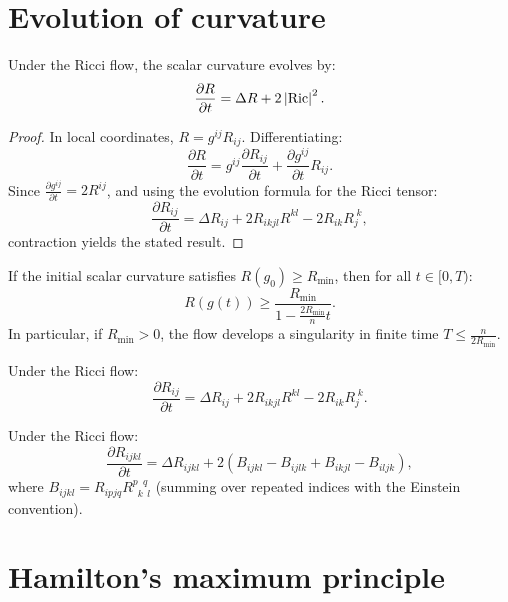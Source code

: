 \section{Evolution of curvature}

\begin{theorem}
\label{thm:evolution_R}
Under the Ricci flow, the scalar curvature evolves by:
\[
    \frac{\partial R}{\partial t} = \Delta R + 2\left| \operatorname{Ric} \right|^2.
\]
\end{theorem}

\begin{proof}
In local coordinates, $R = g^{ij} R_{ij}$. Differentiating:
\[
    \frac{\partial R}{\partial t} = g^{ij} \frac{\partial R_{ij}}{\partial t}
    + \frac{\partial g^{ij}}{\partial t} R_{ij}.
\]
Since $\frac{\partial g^{ij}}{\partial t} = 2R^{ij}$, and using the evolution
formula for the Ricci tensor:
\[
    \frac{\partial R_{ij}}{\partial t} = \Delta R_{ij} + 2R_{ikjl}R^{kl}
    - 2R_{ik}R_j^{\;k},
\]
contraction yields the stated result.
\end{proof}

\begin{corollary}
If the initial scalar curvature satisfies $R(g_0) \geq R_{\min}$, then for all
$t \in [0, T)$:
\[
    R(g(t)) \geq \frac{R_{\min}}{1 - \frac{2R_{\min}}{n} t}.
\]
In particular, if $R_{\min} > 0$, the flow develops a singularity in finite time
$T \leq \frac{n}{2R_{\min}}$.
\end{corollary}

\begin{theorem}
Under the Ricci flow:
\[
    \frac{\partial R_{ij}}{\partial t} = \Delta R_{ij}
    + 2R_{ikjl}R^{kl} - 2R_{ik}R_j^{\;k}.
\]
\end{theorem}

\begin{theorem}
Under the Ricci flow:
\[
    \frac{\partial R_{ijkl}}{\partial t} = \Delta R_{ijkl}
    + 2(B_{ijkl} - B_{ijlk} + B_{ikjl} - B_{iljk}),
\]
where $B_{ijkl} = R_{ipjq}R^{p\phantom{k}q}_{\phantom{p}k\phantom{q}l}$ (summing
over repeated indices with the Einstein convention).
\end{theorem}

\section{Hamilton's maximum principle}

